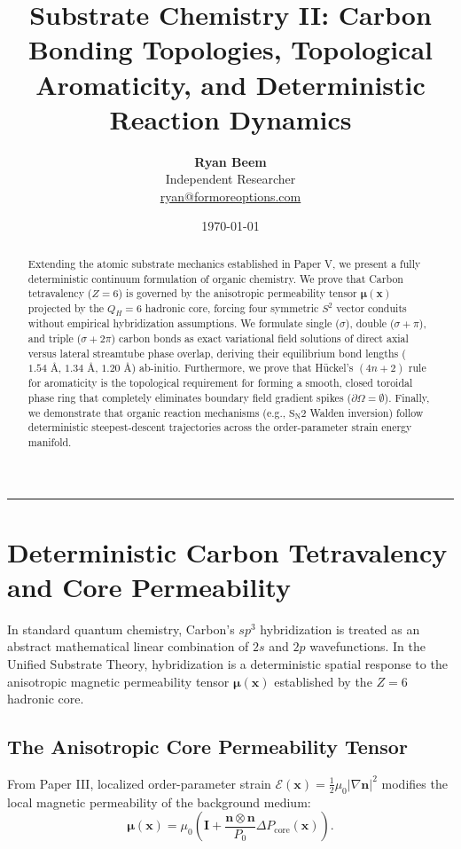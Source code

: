 \documentclass[11pt,a4paper]{article}
\title{\Large\bfseries Substrate Chemistry II: Carbon Bonding Topologies, Topological Aromaticity, and Deterministic Reaction Dynamics}
\author{
	\textbf{Ryan Beem}\\[0.5em]
	\small Independent Researcher \\
	\small \href{mailto:ryan@formoreoptions.com}{ryan@formoreoptions.com}
}
\date{\today}
\begin{document}
	
	\maketitle
	
	\begin{abstract}
		Extending the atomic substrate mechanics established in Paper V, we present a fully deterministic continuum formulation of organic chemistry. We prove that Carbon tetravalency ($Z=6$) is governed by the anisotropic permeability tensor $\boldsymbol{\mu}(\mathbf{x})$ projected by the $Q_H = 6$ hadronic core, forcing four symmetric $S^2$ vector conduits without empirical hybridization assumptions. We formulate single ($\sigma$), double ($\sigma+\pi$), and triple ($\sigma+2\pi$) carbon bonds as exact variational field solutions of direct axial versus lateral streamtube phase overlap, deriving their equilibrium bond lengths ($1.54 \text{ \AA}$, $1.34 \text{ \AA}$, $1.20 \text{ \AA}$) ab-initio. Furthermore, we prove that Hückel's $(4n+2)$ rule for aromaticity is the topological requirement for forming a smooth, closed toroidal phase ring that completely eliminates boundary field gradient spikes ($\partial \Omega = \emptyset$). Finally, we demonstrate that organic reaction mechanisms (e.g., $\text{S}_\text{N}2$ Walden inversion) follow deterministic steepest-descent trajectories across the order-parameter strain energy manifold.
	\end{abstract}
	
	\vspace{1em}
	\hrule
	\vspace{1.5em}
	
	\section{Deterministic Carbon Tetravalency and Core Permeability}
	\label{sec:tetravalency_mechanics}
	
	In standard quantum chemistry, Carbon's $sp^3$ hybridization is treated as an abstract mathematical linear combination of $2s$ and $2p$ wavefunctions. In the Unified Substrate Theory, hybridization is a deterministic spatial response to the anisotropic magnetic permeability tensor $\boldsymbol{\mu}(\mathbf{x})$ established by the $Z=6$ hadronic core.
	
	\subsection{The Anisotropic Core Permeability Tensor}
	From Paper III, localized order-parameter strain $\mathcal{E}(\mathbf{x}) = \frac{1}{2}\mu_0 |\nabla \mathbf{n}|^2$ modifies the local magnetic permeability of the background medium:
	\begin{equation}
		\boldsymbol{\mu}(\mathbf{x}) = \mu_0 \left( \mathbf{I} + \frac{\mathbf{n} \otimes \mathbf{n}}{P_0} \Delta P_{\text{core}}(\mathbf{x}) \right).
		\label{eq:permeability_tensor}
	\end{equation}
	
\end{document}

